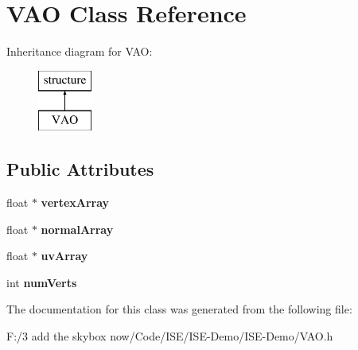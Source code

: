 \hypertarget{class_v_a_o}{\section{V\-A\-O Class Reference}
\label{class_v_a_o}
}
Inheritance diagram for V\-A\-O\-:\begin{figure}[H]
\begin{center}
\leavevmode
\includegraphics[height=2.000000cm]{class_v_a_o}
\end{center}
\end{figure}
\subsection*{Public Attributes}
\begin{DoxyCompactItemize}
\item 
\hypertarget{class_v_a_o_a4bb703efebc8b659fafb9214df1c00a2}{float $\ast$ {\bfseries vertex\-Array}}\label{class_v_a_o_a4bb703efebc8b659fafb9214df1c00a2}

\item 
\hypertarget{class_v_a_o_a8cac351866d092035d0dd3e1db550443}{float $\ast$ {\bfseries normal\-Array}}\label{class_v_a_o_a8cac351866d092035d0dd3e1db550443}

\item 
\hypertarget{class_v_a_o_a151242cdc48c1f31b1db972e0ed623b3}{float $\ast$ {\bfseries uv\-Array}}\label{class_v_a_o_a151242cdc48c1f31b1db972e0ed623b3}

\item 
\hypertarget{class_v_a_o_a25d570ad1a339b9928f34f920cbae339}{int {\bfseries num\-Verts}}\label{class_v_a_o_a25d570ad1a339b9928f34f920cbae339}

\end{DoxyCompactItemize}


The documentation for this class was generated from the following file\-:\begin{DoxyCompactItemize}
\item 
F\-:/3 add the skybox now/\-Code/\-I\-S\-E/\-I\-S\-E-\/\-Demo/\-I\-S\-E-\/\-Demo/V\-A\-O.\-h\end{DoxyCompactItemize}
